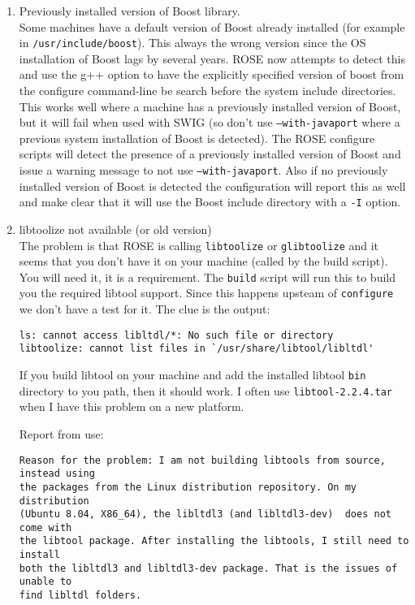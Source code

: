 \begin{enumerate}
   \item Previously installed version of Boost library. \\
    Some machines have a default version of Boost already installed (for example in 
{\tt /usr/include/boost}).  This always the wrong version since the OS installation
of Boost lags by several years.  ROSE now attempts to detect this and use the 
{} g++ option to have the explicitly specified version of boost from
the configure command-line be search before the system include directories.  This works
well where a machine has a previously installed version of Boost, but it will fail when
used with SWIG (so don't use {\tt --with-javaport} where a previous system installation
of Boost is detected).  The ROSE configure scripts will detect the presence of a
previously installed version of Boost and issue a warning message to not use 
{\tt --with-javaport}.  Also if no previously installed version of Boost is detected
the configuration will report this as well and make clear that it will use the Boost
include directory with a {\tt -I} option.

   \item libtoolize not available (or old version) \\
  The problem is that ROSE is calling {\tt libtoolize} or {\tt glibtoolize} and 
it seems that you don't have it on your machine (called by the build script). 
You will need it, it is a requirement. The {\tt build} script will run this to build you the
required libtool support.  Since this happens upsteam of {\tt configure} we don't have a test
for it. The clue is the output:
\begin{verbatim}
ls: cannot access libltdl/*: No such file or directory
libtoolize: cannot list files in `/usr/share/libtool/libltdl'
\end{verbatim}
If you build libtool on your machine and add the installed libtool {\tt bin} directory
to you path, then it should work.  I often use {\tt libtool-2.2.4.tar} when I have 
this problem on a new platform.

Report from use:
\begin{verbatim}
Reason for the problem: I am not building libtools from source, instead using
the packages from the Linux distribution repository. On my distribution
(Ubuntu 8.04, X86_64), the libltdl3 (and libltdl3-dev)  does not come with
the libtool package. After installing the libtools, I still need to install
both the libltdl3 and libltdl3-dev package. That is the issues of unable to
find libltdl folders.
\end{verbatim}


\end{enumerate}
